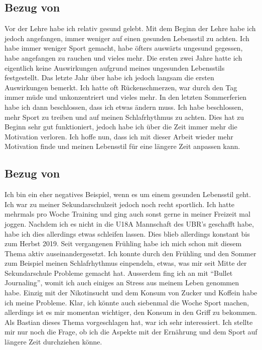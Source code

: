 \subsection{Bezug von \dario}
\authortoc{\dario}{\subsectionident}
\label{bezug:dario}
Vor der Lehre habe ich relativ gesund gelebt. Mit dem Beginn der Lehre habe ich jedoch angefangen, immer weniger auf einen gesunden Lebensstil zu achten.
\newline
Ich habe immer weniger Sport gemacht, habe öfters auswärts ungesund gegessen, habe angefangen zu rauchen und vieles mehr. 
\newline
Die ersten zwei Jahre hatte ich eigentlich keine Auswirkungen aufgrund meines ungesunden Lebensstils festgestellt.
\newline
Das letzte Jahr über habe ich jedoch langsam die ersten Auswirkungen bemerkt. Ich hatte oft Rückenschmerzen, war durch den Tag immer müde und unkonzentriert und vieles mehr.
\newline
In den letzten Sommerferien habe ich dann beschlossen, dass ich etwas ändern muss. Ich habe beschlossen, mehr Sport zu treiben und auf meinen Schlafrhythmus zu achten. 
\newline
Dies hat zu Beginn sehr gut funktioniert, jedoch habe ich über die Zeit immer mehr die Motivation verloren.
\newline
Ich hoffe nun, dass ich mit dieser Arbeit wieder mehr Motivation finde und meinen Lebensstil für eine längere Zeit anpassen kann.
\subsection{Bezug von \jonas}
\authortoc{\jonas}{\subsectionident}
\label{bezug:jonas}
Ich bin ein eher negatives Beispiel, wenn es um einem gesunden Lebensstil geht. Ich war zu meiner Sekundarschulzeit jedoch noch recht sportlich. Ich hatte mehrmals pro Woche Training und ging auch sonst gerne in meiner Freizeit mal joggen. Nachdem ich es nicht in die U18A Mannschaft des UBR's geschafft habe, habe ich dies allerdings etwas schleifen lassen.
\newline
Dies blieb allerdings konstant bis zum Herbst 2019. Seit vergangenen Frühling habe ich mich schon mit diesem Thema aktiv auseinandergesetzt. Ich konnte durch den Frühling und den Sommer zum Beispiel meinen Schlafrhythmus einpendeln, etwas, was mir seit Mitte der Sekundarschule Probleme gemacht hat. Ausserdem fing ich an mit “Bullet Journaling”, womit ich auch einiges an Stress aus meinem Leben genommen habe. Einzig mit der Nikotinsucht und dem Konsum von Zucker und Koffein habe ich meine Probleme. Klar, ich könnte auch siebenmal die Woche Sport machen, allerdings ist es mir momentan wichtiger, den Konsum in den Griff zu bekommen.
\newline
\newline
Als Bastian dieses Thema vorgeschlagen hat, war ich sehr interessiert. Ich stellte mir nur noch die Frage, ob ich die Aspekte mit der Ernährung und dem Sport auf längere Zeit durchziehen könne.